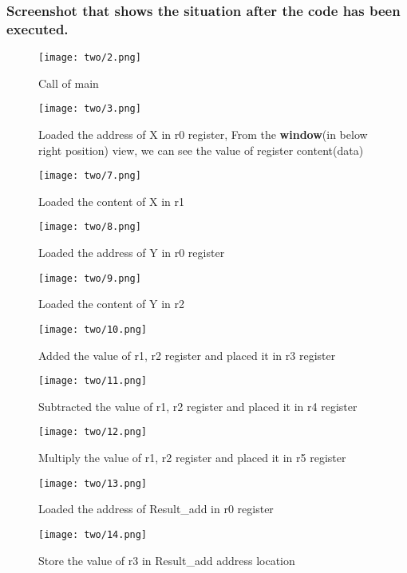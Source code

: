 \documentclass[a4paper,12pt]{article}
\begin{document}
\subsubsection{Screenshot that shows the situation after the code has been executed.}
\begin{figure}[H]
    \centering
    \texttt{[image: two/2.png]}
    \caption{Call of main}
\end{figure}
\begin{figure}[H]
    \centering
    \texttt{[image: two/3.png]}
    \caption{Loaded the address of X in r0 register, From the \textbf{window}(in below right position) view, we can see the value of register content(data)}
\end{figure}
\begin{figure}[H]
    \centering
    \texttt{[image: two/7.png]}
    \caption{Loaded the content of X in r1}
\end{figure}
\begin{figure}[H]
    \centering
    \texttt{[image: two/8.png]}
    \caption{Loaded the address of Y in r0 register}
\end{figure}
\begin{figure}[H]
    \centering
    \texttt{[image: two/9.png]}
    \caption{Loaded the content of Y in r2}
\end{figure}
\begin{figure}[H]
    \centering
    \texttt{[image: two/10.png]}
    \caption{Added the value of r1, r2 register and placed it in r3 register}
\end{figure}
\begin{figure}[H]
    \centering
    \texttt{[image: two/11.png]}
    \caption{Subtracted the value of r1, r2 register and placed it in r4 register}
\end{figure}
\begin{figure}[H]
    \centering
    \texttt{[image: two/12.png]}
    \caption{Multiply the value of r1, r2 register and placed it in r5 register}
\end{figure}
\begin{figure}[H]
    \centering
    \texttt{[image: two/13.png]}
    \caption{Loaded the address of Result\_add in r0 register}
\end{figure}
\begin{figure}[H]
    \centering
    \texttt{[image: two/14.png]}
    \caption{Store the value of r3 in Result\_add address location}
\end{figure}
\end{document}
